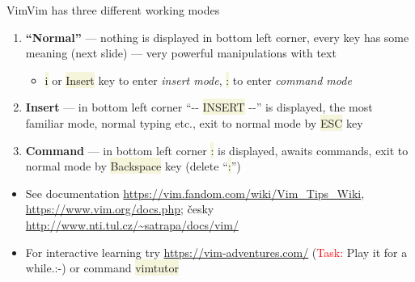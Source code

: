 \documentclass[compress, ucs, xelatex, 11pt, xcolor=svgnames, aspectratio=169,
	hyperref={
		bookmarks=true,
		unicode=true,
		colorlinks=true,
		pdftitle={Linux, command line and MetaCentrum},
		plainpages=false,
		pdfauthor={Vojtech Zeisek},
		pdfsubject={Course about use of Linux command line, writing shell scripts and using MetaCentrum of CESNET},
		pdfcreator={XeLaTeX},
		pdfkeywords={Linux, GNU, BASH, shell, command line, MetaCentrum},
		linkcolor=DarkRed, %
		anchorcolor=DarkBlue, %
		citecolor=Indigo, %
		filecolor=NavyBlue, %
		menucolor=DarkMagenta, %
		urlcolor=DarkBlue, %
		pdftex},
	url={hyphens, lowtilde} %
	]{beamer}
\renewcommand{\texttt}[1]{\colorbox{Beige}{{\ttfamily #1}}}
\renewcommand{\alert}[1]{\textcolor{red}{#1}}
\begin{document}
\begin{frame}{Vim}{Vim has three different working modes}
	\label{vim}
	\begin{enumerate}
		\item \textbf{\enquote{Normal}} --- nothing is displayed in bottom left corner, every key has some meaning (next slide) --- very powerful manipulations with text
		\begin{itemize}
			\item \texttt{i} or \texttt{Insert} key to enter \textit{insert mode}, \texttt{:} to enter \textit{command mode}
		\end{itemize}
		\item \textbf{Insert} --- in bottom left corner \enquote{{-}- \texttt{INSERT} -{-}} is displayed, the most familiar mode, normal typing etc., exit to normal mode by \texttt{ESC} key
		\item \textbf{Command} --- in bottom left corner \texttt{:} is displayed, awaits commands, exit to normal mode by \texttt{Backspace} key (delete \enquote{\texttt{:}})
	\end{enumerate}
	\begin{itemize}
		\item See documentation \url{https://vim.fandom.com/wiki/Vim_Tips_Wiki}, \url{https://www.vim.org/docs.php}; česky \url{http://www.nti.tul.cz/~satrapa/docs/vim/}
		\item For interactive learning try \url{https://vim-adventures.com/} (\alert{Task:} Play it for a while.:-) or command \texttt{vimtutor}
	\end{itemize}
\end{frame}
\end{document}
